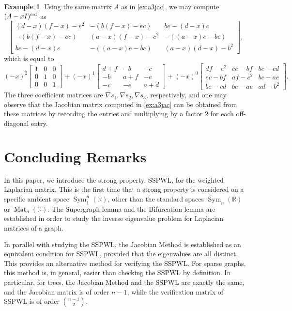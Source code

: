 \documentclass{article}
\theoremstyle{definition}
\newtheorem{example}[theorem]{Example}
\newcommand{\cof}{^{\rm cof}}
\newcommand{\bone}{\mathbf{1}}
\newcommand{\mat}[1][n]{\operatorname{Mat}_{#1}(\mathbb{R})}
\newcommand{\msym}[1][n]{\operatorname{Sym}_{#1}(\mathbb{R})}
\newcommand{\msymz}[1][n]{\operatorname{Sym}_{\bone}^{#1}(\mathbb{R})}
\begin{document}
\begin{example}
\label{ex:a3gradient}
Using the same matrix $A$ as in \cref{ex:a3jac}, we may compute $(A - xI)\cof$ as 
\[
    \begin{bmatrix}
        (d-x)(f-x)-e^2 & -(b(f-x)-ec) & be-(d-x)c \\
        -(b(f-x)-ec) & (a-x)(f-x)-c^2 & -((a-x)e-bc) \\
        be-(d-x)c & -((a-x)e-bc) & (a-x)(d-x)-b^2
    \end{bmatrix},
\]
which is equal to
{\footnotesize
\[
    (-x)^2\begin{bmatrix}
        1 & 0 & 0 \\
        0 & 1 & 0 \\
        0 & 0 & 1
    \end{bmatrix} +  
    (-x)^1\begin{bmatrix}
        d+f & -b & -c \\
        -b & a+f & -e \\
        -c & -e & a+d
    \end{bmatrix} + 
    (-x)^0\begin{bmatrix}
        df-e^2 & ec-bf & be-cd \\
        ec-bf & af-c^2 & bc-ae \\
        be-cd & bc-ae & ad-b^2
    \end{bmatrix}.
\]
}
The three coefficient matrices are $\nabla s_1, \nabla s_2, \nabla s_3$, respectively, and one may observe that the Jacobian matrix computed in \cref{ex:a3jac} can be obtained from these matrices by recording the entries and multiplying by a factor $2$ for each off-diagonal entry.
\end{example}


\section{Concluding Remarks}
\label{sec:concluding_remarks}

In this paper, we introduce the strong property, SSPWL, for the weighted Laplacian matrix.  This is the first time that a strong property is considered on a specific ambient space $\msymz$, other than the standard spaces $\msym$ or $\mat$.  The Supergraph lemma and the Bifurcation lemma are established in order to study the inverse eigenvalue problem for Laplacian matrices of a graph.  

In parallel with studying the SSPWL, the Jacobian Method is established as an equivalent condition for SSPWL, provided that the eigenvalues are all distinct.  This provides an alternative method for verifying the SSPWL.  For sparse graphs, this method is, in general, easier than checking the SSPWL by definition.  In particular, for trees, the Jacobian Method and the SSPWL are exactly the same, and the Jacobian matrix is of order $n-1$, while the verification matrix of SSPWL is of order $\binom{n-1}{2}$.  
\end{document}
